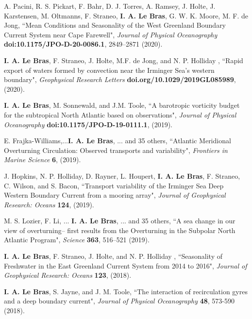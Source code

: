 \documentclass[paper=letter,fontsize=11pt]{scrartcl} %
\newcommand{\PaperEntry}[6]{
		\noindent #1, ``#2", \textit{#3} \textbf{#4}, #5 (#6).}
\begin{document}
\begin{etaremune}
\item \PaperEntry{A. Pacini, R. S. Pickart, F. Bahr, D. J. Torres, A. Ramsey, J. Holte, J. Karstensen, M. Oltmanns, F. Straneo, \textbf{I. A. Le Bras}, G. W. K. Moore, M. F. de Jong}{Mean Conditions and Seasonality of the West Greenland Boundary Current System near Cape Farewell}{Journal of Physical Oceanography}{doi:10.1175/JPO-D-20-0086.1}{2849--2871}{2020}

\item \PaperEntry{\textbf{I. A. Le Bras}, F. Straneo, J. Holte, M.F. de Jong, and N. P. Holliday }{Rapid export of waters formed by convection near the Irminger Sea's western boundary}{Geophysical Research Letters}{doi.org/10.1029/2019GL085989}{}{2020}

\item \PaperEntry{\textbf{I. A. Le Bras}, M. Sonnewald, and J.M. Toole}{A barotropic vorticity budget for the subtropical North Atlantic based on observations}{Journal of Physical Oceanography}{doi:10.1175/JPO-D-19-0111.1}{}{2019}

\item \PaperEntry{E. Frajka-Williams,...\textbf{I. A. Le Bras}, ... and 35 others}{Atlantic Meridional Overturning Circulation: Observed transports and variability}{Frontiers in Marine Science}{6}{}{2019}

\item \PaperEntry{J. Hopkins, N. P. Holliday, D. Rayner, L. Houpert, \textbf{I. A. Le Bras}, F. Straneo, C. Wilson, and S. Bacon}{Transport variability of the Irminger Sea Deep Western Boundary Current from a mooring array}{Journal of Geophysical Research: Oceans}{124}{}{2019}

\item \PaperEntry{M. S. Lozier, F.  Li, ... \textbf{I. A. Le Bras}, ... and 35 others}{A sea change in our view of overturning– first results from the
Overturning in the Subpolar North Atlantic Program}{Science}{363}{516--521}{2019}

\item \PaperEntry{\textbf{I. A. Le Bras}, F. Straneo, J. Holte, and N. P. Holliday }{Seasonality of Freshwater in the East Greenland Current
System from 2014 to 2016}{Journal of Geophysical Research: Oceans}{123}{}{2018}

\item \PaperEntry{\textbf{I. A. Le Bras}, S. Jayne, and J. M. Toole}{The interaction of recirculation gyres and a deep boundary current}{Journal of Physical Oceanography}{48}{573-590}{2018}
	

\end{etaremune}
\end{document}
